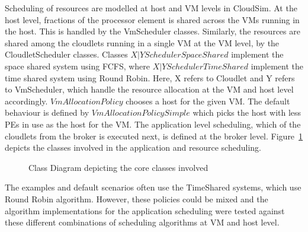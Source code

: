 \documentclass[times, 10pt,twocolumn]{article}
\begin{document}
Scheduling of resources are modelled at host and VM levels in CloudSim. At the host level, fractions of the processor element is shared across the VMs running in the host. This is handled by the VmScheduler classes. Similarly, the resources are shared among the cloudlets running in a single VM at the VM level, by the CloudletScheduler classes. Classes ${X|Y}SchedulerSpaceShared$ implement the space shared system using FCFS, where ${X|Y}SchedulerTimeShared$ implement the time shared system using Round Robin. Here, X refers to Cloudlet and Y refers to VmScheduler, which handle the resource allocation at the VM and host level accordingly. $VmAllocationPolicy$ chooses a host for the given VM. The default behaviour is defined by $VmAllocationPolicySimple$ which picks the host with less PEs in use as the host for the VM. The application level scheduling, which of the cloudlets from the broker is executed next, is defined at the broker level. Figure~\ref{fig:classdiagram} depicts the classes involved in the application and resource scheduling.
\begin{figure}[ht]
 \caption{Class Diagram depicting the core classes involved}
 \label{fig:classdiagram}
\end{figure}

The examples and default scenarios often use the TimeShared systems, which use Round Robin algorithm. However, these policies could be mixed and the algorithm implementations for the application scheduling were tested against these different combinations of scheduling algorithms at VM and host level.
\end{document}
